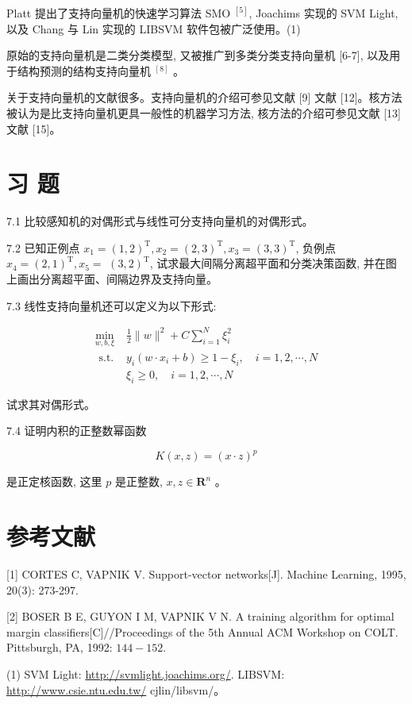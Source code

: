\documentclass[10pt]{article}
\begin{document}
Platt 提出了支持向量机的快速学习算法 SMO ${ }^{[5]}$, Joachims 实现的 SVM Light, 以及 Chang 与 Lin 实现的 LIBSVM 软件包被广泛使用。(1)

原始的支持向量机是二类分类模型, 又被推广到多类分类支持向量机 [6-7], 以及用于结构预测的结构支持向量机 ${ }^{[8]}$ 。

关于支持向量机的文献很多。支持向量机的介绍可参见文献 [9] 文献 [12]。核方法被认为是比支持向量机更具一般性的机器学习方法, 核方法的介绍可参见文献 [13] 文献 [15]。

\section*{习 题}
7.1 比较感知机的对偶形式与线性可分支持向量机的对偶形式。

7.2 已知正例点 $x_{1}=(1,2)^{\mathrm{T}}, x_{2}=(2,3)^{\mathrm{T}}, x_{3}=(3,3)^{\mathrm{T}}$, 负例点 $x_{4}=(2,1)^{\mathrm{T}}, x_{5}=$ $(3,2)^{\mathrm{T}}$, 试求最大间隔分离超平面和分类决策函数, 并在图上画出分离超平面、间隔边界及支持向量。

7.3 线性支持向量机还可以定义为以下形式:

$$
\begin{array}{ll}
\min _{w, b, \xi} & \frac{1}{2}\|w\|^{2}+C \sum_{i=1}^{N} \xi_{i}^{2} \\
\text { s.t. } & y_{i}\left(w \cdot x_{i}+b\right) \geqslant 1-\xi_{i}, \quad i=1,2, \cdots, N \\
& \xi_{i} \geqslant 0, \quad i=1,2, \cdots, N
\end{array}
$$

试求其对偶形式。

7.4 证明内积的正整数幂函数

$$
K(x, z)=(x \cdot z)^{p}
$$

是正定核函数, 这里 $p$ 是正整数, $x, z \in \boldsymbol{R}^{n}$ 。

\section*{参考文献}
[1] CORTES C, VAPNIK V. Support-vector networks[J]. Machine Learning, 1995, 20(3): 273-297.

[2] BOSER B E, GUYON I M, VAPNIK V N. A training algorithm for optimal margin classifiers[C]//Proceedings of the 5th Annual ACM Workshop on COLT. Pittsburgh, PA, 1992: $144-152$.

(1) SVM Light: \href{http://svmlight.joachims.org/}{http://svmlight.joachims.org/}. LIBSVM: \href{http://www.csie.ntu.edu.tw/}{http://www.csie.ntu.edu.tw/} cjlin/libsvm/。
\end{document}
